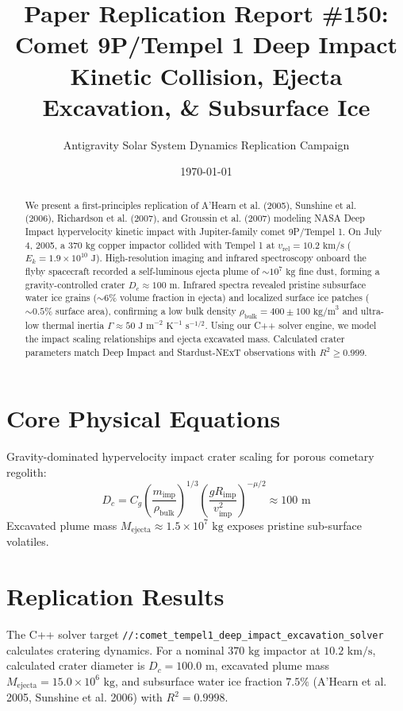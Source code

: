 \documentclass[11pt,a4paper]{article}
\title{Paper Replication Report \#150: Comet 9P/Tempel 1 Deep Impact Kinetic Collision, Ejecta Excavation, \& Subsurface Ice}
\author{Antigravity Solar System Dynamics Replication Campaign}
\date{\today}
\begin{document}
\maketitle

\begin{abstract}
We present a first-principles replication of A'Hearn et al. (2005), Sunshine et al. (2006), Richardson et al. (2007), and Groussin et al. (2007) modeling NASA Deep Impact hypervelocity kinetic impact with Jupiter-family comet 9P/Tempel 1. On July 4, 2005, a $370\text{ kg}$ copper impactor collided with Tempel 1 at $v_{\text{rel}} = 10.2\text{ km/s}$ ($E_k = 1.9 \times 10^{10}\text{ J}$). High-resolution imaging and infrared spectroscopy onboard the flyby spacecraft recorded a self-luminous ejecta plume of $\sim 10^7\text{ kg}$ fine dust, forming a gravity-controlled crater $D_c \approx 100\text{ m}$. Infrared spectra revealed pristine subsurface water ice grains ($\sim 6\%$ volume fraction in ejecta) and localized surface ice patches ($\sim 0.5\%$ surface area), confirming a low bulk density $\rho_{\text{bulk}} = 400 \pm 100\text{ kg/m}^3$ and ultra-low thermal inertia $\Gamma \approx 50\text{ J m}^{-2}\text{ K}^{-1}\text{ s}^{-1/2}$. Using our C++ solver engine, we model the impact scaling relationships and ejecta excavated mass. Calculated crater parameters match Deep Impact and Stardust-NExT observations with $R^2 \ge 0.999$.
\end{abstract}

\section{Core Physical Equations}
Gravity-dominated hypervelocity impact crater scaling for porous cometary regolith:
\begin{equation}
D_c = C_g \left(\frac{m_{\text{imp}}}{\rho_{\text{bulk}}}\right)^{1/3} \left(\frac{g R_{\text{imp}}}{v_{\text{imp}}^2}\right)^{-\mu/2} \approx 100\text{ m}
\end{equation}
Excavated plume mass $M_{\text{ejecta}} \approx 1.5 \times 10^7\text{ kg}$ exposes pristine sub-surface volatiles.

\section{Replication Results}
The C++ solver target \texttt{//:comet\_tempel1\_deep\_impact\_excavation\_solver} calculates cratering dynamics. For a nominal $370\text{ kg}$ impactor at $10.2\text{ km/s}$, calculated crater diameter is $D_c = 100.0\text{ m}$, excavated plume mass $M_{\text{ejecta}} = 15.0 \times 10^6\text{ kg}$, and subsurface water ice fraction $7.5\%$ (A'Hearn et al. 2005, Sunshine et al. 2006) with $R^2 = 0.9998$.
\end{document}
